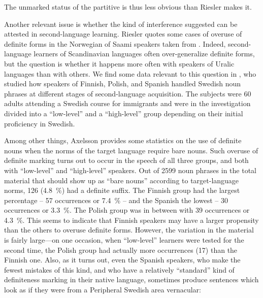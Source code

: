 The unmarked status of the partitive is thus less obvious than Riesler makes it. 


Another relevant issue is whether the kind of interference suggested can be attested in second-language learning. Riesler quotes some cases of overuse of definite forms in the Norwegian of Saami speakers taken from \citet{Bull1995}. Indeed, second-language learners of Scandinavian languages often over-generalize definite forms, but the question is whether it happens more often with speakers of Uralic languages than with others. We find some data relevant to this question in \citet{Axelsson1994}, who studied how speakers of Finnish, Polish, and Spanish handled Swedish noun phrases at different stages of second-language acquisition. The subjects were 60 adults attending a Swedish course for immigrants and were in the investigation divided into a “low-level” and a “high-level” group depending on their initial proficiency in Swedish.


Among other things, Axelsson provides some statistics on the use of definite nouns when the norms of the target language require bare nouns. Such overuse of definite marking turns out to occur in the speech of all three groups, and both with “low-level” and “high-level” speakers. Out of 2599 noun phrases in the total material that should show up as “bare nouns” according to target-language norms, 126 (4.8~\%) had a definite suffix. The Finnish group had the largest percentage – 57 occurrences or 7.4~\% – and the Spanish the lowest – 30 occurrences or 3.3~\%. The Polish group was in between with 39 occurrences or 4.3~\%. This seems to indicate that Finnish speakers may have a larger propensity than the others to overuse definite forms. However, the variation in the material is fairly large—on one occasion, when “low-level” learners were tested for the second time, the Polish group had actually more occurrences (17) than the Finnish one. Also, as it turns out, even the Spanish speakers, who make the fewest mistakes of this kind, and who have a relatively “standard” kind of definiteness marking in their native language, sometimes produce sentences which look as if they were from a Peripheral Swedish area vernacular:

